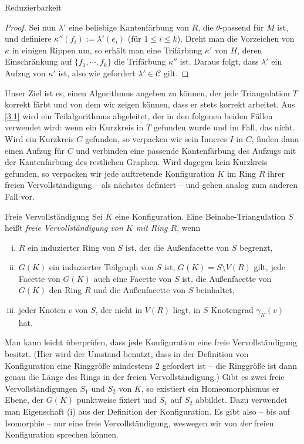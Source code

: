 \begin{section}{Reduzierbarkeit}
\begin{proof}
  Sei nun $\lambda'$ eine beliebige Kantenfärbung von $R$, die $\theta$-passend für $M$ ist, und definiere $\kappa''(f_i) := \lambda'(e_i)$ (für $1\leq i \leq k$). Dreht man die Vorzeichen von $\kappa$ in einigen Rippen um, so erhält man eine Trifärbung $\kappa'$ von $H$, deren Einschränkung auf $\{f_1,\cdots,f_k\}$ die Trifärbung $\kappa''$ ist. Daraus folgt, dass $\lambda'$ ein Aufzug von $\kappa'$ ist, also wie gefordert $\lambda' \in \mathscr{C}$ gilt. 
 \end{proof}
 
 Unser Ziel ist es, einen Algorithmus angeben zu können, der jede Triangulation $T$ korrekt färbt und von dem wir zeigen können, dass er stets korrekt arbeitet. Aus \ref{3.1} wird ein Teilalgorithmus abgeleitet, der in den folgenen beiden Fällen verwendet wird: wenn ein Kurzkreis in $T$ gefunden wurde und im Fall, das nicht. Wird ein Kurzkreis $C$ gefunden, so verpacken wir sein Inneres $I$ in $C$, finden dann einen Aufzug für $C$ und verbinden eine passende Kantenfärbung des Aufzugs mit der Kantenfärbung des restlichen Graphen. Wird dagegen kein Kurzkreis gefunden, so verpacken wir jede auftretende Konfiguration $K$ im Ring $R$ ihrer freien Vervollständigung -- als nächstes definiert -- und gehen analog zum anderen Fall vor. 

\begin{definition}{Freie Vervollständigung}
  Sei $K$ eine Konfiguration. Eine Beinahe-Triangulation $S$ heißt \textit{freie Vervollständigung von $K$ mit Ring $R$}, wenn
  \begin{enumerate}[(i)]
   \item $R$ ein induzierter Ring von $S$ ist, der die Außenfacette von $S$ begrenzt,
   \item $G(K)$ ein induzierter Teilgraph von $S$ ist, $G(K) = S \setminus V(R)$ gilt, jede Facette von $G(K)$ auch eine Facette von $S$ ist, die Außenfacette von $G(K)$ den Ring $R$ und die Außenfacette von $S$ beinhaltet,
   \item jeder Knoten $v$ von $S$, der nicht in $V(R)$ liegt, in $S$ Knotengrad $\gamma_K(v)$ hat.
  \end{enumerate}
 \end{definition}
 
 Man kann leicht überprüfen, dass jede Konfiguration eine freie Vervollständigung besitzt. (Hier wird der Umstand benutzt, dass in der Definition von Konfiguration eine Ringgröße mindestens $2$ gefordert ist -- die Ringgröße ist dann genau die Länge des Rings in der freien Vervollständigung.) Gibt es zwei freie Vervollständigungen $S_1$ und $S_2$ von $K$, so existiert ein Homeomorphismus er Ebene, der $G(K)$ punktweise fixiert und $S_1$ auf $S_2$ abbildet. Dazu verwendet man Eigenschaft (i) aus der Definition der Konfiguration. Es gibt also -- bis auf Isomorphie -- nur eine freie Vervollständigung, weswegen wir von \textit{der} freien Konfiguration sprechen können.
 

\end{section}
